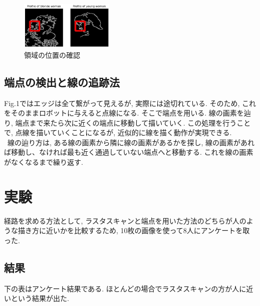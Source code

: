 \documentclass[10pt]{jarticle}
\begin{document}
    \begin{center}
        \begin{figure}[h]
            \includegraphics[width=0.40\textwidth]{img/003.png}
            \caption{領域の位置の確認}
            \label{the position of a region}
        \end{figure}
    \end{center}
	

	\subsection{端点の検出と線の追跡法}
	Fig.1ではエッジは全て繋がって見えるが, 実際には途切れている. そのため, これをそのままロボットに与えると点線になる.
	そこで端点を用いる.
	線の画素を辿り, 端点まで来たら次に近くの端点に移動して描いていく.
	この処理を行うことで, 点線を描いていくことになるが, 近似的に線を描く動作が実現できる.
  \\\  
	線の辿り方は, ある線の画素から隣に線の画素があるかを探し, 線の画素があれば移動し、なければ最も近く通過していない端点へと移動する.
	これを線の画素がなくなるまで繰り返す.
	
	\section{実験}
	経路を求める方法として, ラスタスキャンと端点を用いた方法のどちらが人のような描き方に近いかを比較するため, 10枚の画像を使って8人にアンケートを取った.

	\subsection{結果}
	下の表はアンケート結果である. ほとんどの場合でラスタスキャンの方が人に近いという結果が出た. 
\end{document}
